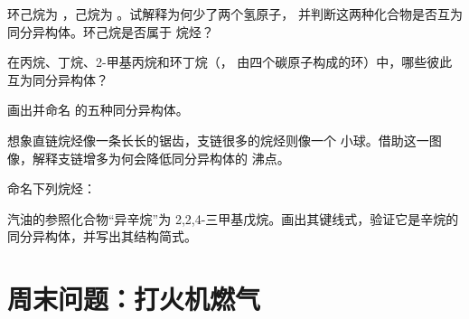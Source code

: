 \begin{exercise}[$\star\star$]\label{exo:g11:organic-skeletons:10}
环己烷为 ，己烷为 。试解释为何少了两个氢原子，
并判断这两种化合物是否互为同分异构体。环己烷是否属于
烷烃？
\end{exercise}

\begin{exercise}[$\star\star$]\label{exo:g11:organic-skeletons:11}
在丙烷、丁烷、2-甲基丙烷和环丁烷（，
由四个碳原子构成的环）中，哪些彼此互为同分异构体？
\end{exercise}

\begin{exercise}[$\star\star\star$]\label{exo:g11:organic-skeletons:12}
画出并命名  的五种同分异构体。
\end{exercise}

\begin{exercise}[$\star\star\star$]\label{exo:g11:organic-skeletons:13}
想象直链烷烃像一条长长的锯齿，支链很多的烷烃则像一个
小球。借助这一图像，解释支链增多为何会降低同分异构体的
沸点。
\end{exercise}

\begin{exercise}[$\star\star\star$]\label{exo:g11:organic-skeletons:14}
命名下列烷烃：
\begin{center}
\end{center}
\end{exercise}

\begin{exercise}[$\star\star\star$]\label{exo:g11:organic-skeletons:15}
汽油的参照化合物“异辛烷”为
2,2,4-三甲基戊烷。画出其键线式，验证它是辛烷的
同分异构体，并写出其结构简式。
\end{exercise}

\section{周末问题：打火机燃气}

